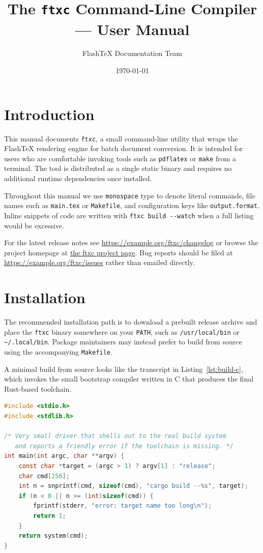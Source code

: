 \documentclass[11pt]{article}
\title{The \texttt{ftxc} Command-Line Compiler --- User Manual}
\author{FlashTeX Documentation Team}
\date{\today}
\begin{document}
\maketitle

\section{Introduction}

This manual documents \texttt{ftxc}, a small command-line utility that wraps
the FlashTeX rendering engine for batch document conversion. It is intended
for users who are comfortable invoking tools such as \texttt{pdflatex} or
\texttt{make} from a terminal. The tool is distributed as a single static
binary and requires no additional runtime dependencies once installed.

Throughout this manual we use \texttt{monospace} type to denote literal
commands, file names such as \texttt{main.tex} or \texttt{Makefile}, and
configuration keys like \texttt{output.format}. Inline snippets of code are
written with \lstinline|ftxc build --watch| when a full listing would be
excessive.

For the latest release notes see \url{https://example.org/ftxc/changelog}
or browse the project homepage at \href{https://example.org/ftxc}{the ftxc
project page}. Bug reports should be filed at
\url{https://example.org/ftxc/issues} rather than emailed directly.

\section{Installation}

The recommended installation path is to download a prebuilt release archive
and place the \texttt{ftxc} binary somewhere on your \texttt{PATH}, such as
\texttt{/usr/local/bin} or \texttt{\textasciitilde/.local/bin}. Package
maintainers may instead prefer to build from source using the accompanying
\texttt{Makefile}.

A minimal build from source looks like the transcript in
Listing~\ref{lst:build-c}, which invokes the small bootstrap compiler
written in C that produces the final Rust-based toolchain.

\begin{lstlisting}[language=C,caption={Bootstrap build driver (C)},label={lst:build-c}]
#include <stdio.h>
#include <stdlib.h>

/* Very small driver that shells out to the real build system
   and reports a friendly error if the toolchain is missing. */
int main(int argc, char **argv) {
    const char *target = (argc > 1) ? argv[1] : "release";
    char cmd[256];
    int n = snprintf(cmd, sizeof(cmd), "cargo build --%s", target);
    if (n < 0 || n >= (int)sizeof(cmd)) {
        fprintf(stderr, "error: target name too long\n");
        return 1;
    }
    return system(cmd);
}
\end{lstlisting}
\end{document}

